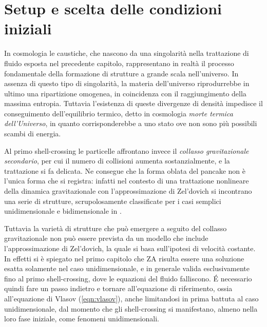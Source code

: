 \section{Setup e scelta delle condizioni iniziali}

In cosmologia le caustiche, che nascono da una singolarità nella trattazione di fluido esposta nel precedente
capitolo, rappresentano in realtà il processo fondamentale della formazione di strutture a grande scala 
nell'universo. In assenza di questo tipo di singolarità, la materia dell'universo riprodurrebbe in ultimo una
ripartizione omogenea, in coincidenza con il raggiungimento della massima entropia. Tuttavia l'esistenza di queste
divergenze di densità impedisce il conseguimento dell'equilibrio termico, detto in cosmologia \textit{morte termica dell'Universo},
in quanto corrisponderebbe a uno stato ove non sono più possibili scambi di energia. 

Al primo shell-crossing le particelle affrontano invece il \textit{collasso gravitazionale
secondario}, per cui il numero di collisioni aumenta sostanzialmente, e la trattazione si fa delicata. 
Ne consegue che la forma oblata del pancake non è l'unica forma che si 
registra: infatti nel contesto di una trattazione nonlineare della dinamica gravitazionale con l'approssimazione
di Zel'dovich si incontrano una serie di strutture, scrupolosamente classificate per i casi semplici unidimensionale
e bidimensionale in \cite{arnold}.

Tuttavia la varietà di strutture che può emergere a seguito del collasso gravitazionale non può essere prevista
da un modello che include l'approssimazione di Zel'dovich, la quale si basa sull'ipotesi di velocità costante.
In effetti si è spiegato nel primo capitolo che ZA risulta essere una soluzione esatta solamente nel caso 
unidimensionale, e in generale valida esclusivamente fino al primo shell-crossing, dove le equazioni del
fluido falliscono. \'E necessario quindi fare un passo indietro e tornare all'equazione di riferimento, ossia all'equazione di Vlasov 
(\ref{eqn:vlasov}), anche limitandosi in prima battuta al caso unidimensionale, dal momento che gli 
shell-crossing si manifestano, almeno nella loro fase iniziale, come fenomeni unidimensionali.


